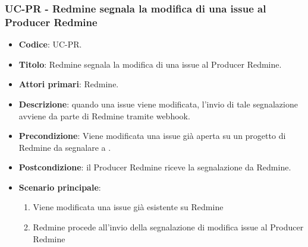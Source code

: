 	\subsubsection{UC\theuccount-PR - Redmine segnala la modifica di una issue al Producer Redmine}
	\begin{itemize}
		\item \textbf{Codice}: UC\theuccount-PR.
		\item \textbf{Titolo}: Redmine segnala la modifica di una issue al Producer Redmine.
		\item \textbf{Attori primari}: Redmine.
		\item \textbf{Descrizione}: quando una issue viene modificata, l'invio di tale segnalazione
			avviene da parte di Redmine tramite webhook.
		\item \textbf{Precondizione}: Viene modificata una issue già aperta su un
		progetto di Redmine da segnalare a \progetto.
		\item \textbf{Postcondizione}: il Producer Redmine riceve la segnalazione da Redmine.
		\item \textbf{Scenario principale}: 
		\begin{enumerate}
			\item Viene modificata una issue già esistente su Redmine
			\item Redmine procede all'invio della segnalazione di modifica issue al Producer Redmine
		\end{enumerate}
		
	\end{itemize}